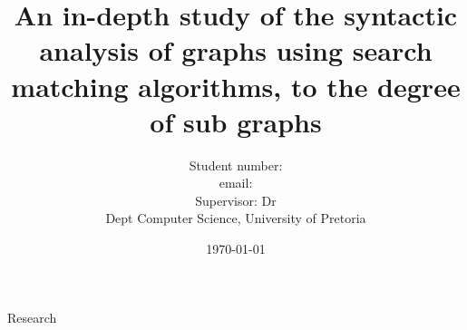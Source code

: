 \documentclass[titlepage]{article}
\title{An in-depth study of the syntactic analysis of graphs using search matching algorithms, to the degree of sub graphs}
\author{Student number:  \\
		email:  \\
		Supervisor: Dr  \\
		Dept Computer Science, University of Pretoria}
\date{\today}
\begin{document}
\maketitle

\newpage

{Research}
\end{document}
